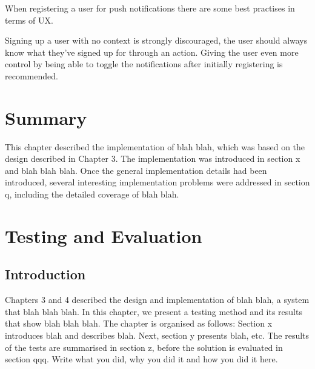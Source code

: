 
When registering a user for push notifications there are some best practises in terms of UX.

Signing up a user with no context is strongly discouraged, the user should always know what they've signed up for through an action. Giving the user even more control by being able to toggle the notifications after initially registering is recommended. \cite{best_practises_push_notifications}



\section{Summary} \label{s-i--summary}

This chapter described the implementation of blah blah, which was based on the design described in Chapter 3. The implementation was introduced in section x and blah blah blah. Once the general implementation details had been introduced, several interesting implementation problems were addressed in section q, including the detailed coverage of blah blah.

\section{Testing and Evaluation} \label{s-i--testing-and-evaluation}

\subsection{Introduction}

Chapters 3 and 4 described the design and implementation of blah blah, a system that blah blah blah.  In this chapter, we present a testing method and its results that show blah blah blah.  The chapter is organised as follows:  Section x introduces blah and describes blah.  Next, section y presents blah, etc.
The results of the tests are summarised in section z, before the solution is evaluated in section qqq.
Write what you did, why you did it and how you did it here.

